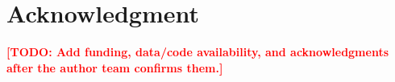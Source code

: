 \documentclass[lettersize,journal]{IEEEtran}
\newcommand{\drafttodo}[1]{\textcolor{red}{\textbf{[TODO: #1]}}}
\begin{document}
\section*{Acknowledgment}
\drafttodo{Add funding, data/code availability, and acknowledgments after the author team confirms them.}



\end{document}
